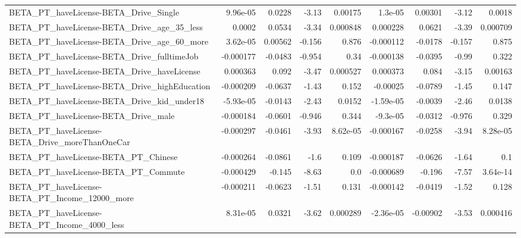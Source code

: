 \begin{tabular}{lrrrrrrrr}
BETA\_PT\_haveLicense-BETA\_Drive\_Single              &    9.96e-05 &       0.0228 &    -3.13 &  0.00175 &    1.3e-05 &     0.00301 &        -3.12 &        0.0018 \\
BETA\_PT\_haveLicense-BETA\_Drive\_age\_35\_less         &      0.0002 &       0.0534 &    -3.34 & 0.000848 &   0.000228 &      0.0621 &        -3.39 &      0.000709 \\
BETA\_PT\_haveLicense-BETA\_Drive\_age\_60\_more         &    3.62e-05 &      0.00562 &   -0.156 &    0.876 &  -0.000112 &     -0.0178 &       -0.157 &         0.875 \\
BETA\_PT\_haveLicense-BETA\_Drive\_fulltimeJob         &   -0.000177 &      -0.0483 &   -0.954 &     0.34 &  -0.000138 &     -0.0395 &        -0.99 &         0.322 \\
BETA\_PT\_haveLicense-BETA\_Drive\_haveLicense         &    0.000363 &        0.092 &    -3.47 & 0.000527 &   0.000373 &       0.084 &        -3.15 &       0.00163 \\
BETA\_PT\_haveLicense-BETA\_Drive\_highEducation       &   -0.000209 &      -0.0637 &    -1.43 &    0.152 &   -0.00025 &     -0.0789 &        -1.45 &         0.147 \\
BETA\_PT\_haveLicense-BETA\_Drive\_kid\_under18         &   -5.93e-05 &      -0.0143 &    -2.43 &   0.0152 &  -1.59e-05 &     -0.0039 &        -2.46 &        0.0138 \\
BETA\_PT\_haveLicense-BETA\_Drive\_male                &   -0.000184 &      -0.0601 &   -0.946 &    0.344 &   -9.3e-05 &     -0.0312 &       -0.976 &         0.329 \\
BETA\_PT\_haveLicense-BETA\_Drive\_moreThanOneCar      &   -0.000297 &      -0.0461 &    -3.93 & 8.62e-05 &  -0.000167 &     -0.0258 &        -3.94 &      8.28e-05 \\
BETA\_PT\_haveLicense-BETA\_PT\_Chinese                &   -0.000264 &      -0.0861 &     -1.6 &    0.109 &  -0.000187 &     -0.0626 &        -1.64 &           0.1 \\
BETA\_PT\_haveLicense-BETA\_PT\_Commute                &   -0.000429 &       -0.145 &    -8.63 &      0.0 &  -0.000689 &      -0.196 &        -7.57 &      3.64e-14 \\
BETA\_PT\_haveLicense-BETA\_PT\_Income\_12000\_more      &   -0.000211 &      -0.0623 &    -1.51 &    0.131 &  -0.000142 &     -0.0419 &        -1.52 &         0.128 \\
BETA\_PT\_haveLicense-BETA\_PT\_Income\_4000\_less       &    8.31e-05 &       0.0321 &    -3.62 & 0.000289 &  -2.36e-05 &    -0.00902 &        -3.53 &      0.000416 \\

\end{tabular}
